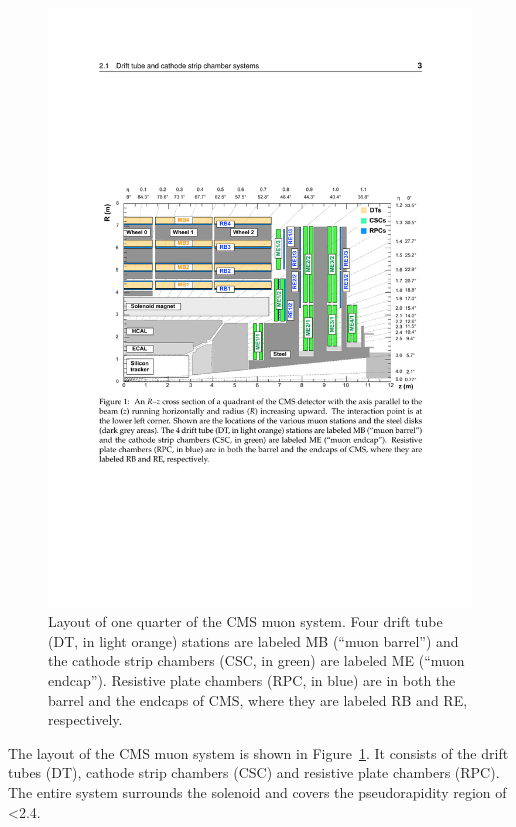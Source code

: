 \begin{figure}[htbp]
  \begin{center}
    \leavevmode
    \includegraphics[width=\columnwidth]{muon_system}
    \caption{Layout of one quarter of the CMS muon system. Four drift tube (DT, in light orange) stations are labeled MB
    (“muon barrel”) and the cathode strip chambers (CSC, in green) are labeled ME (“muon endcap”). Resistive plate
    chambers (RPC, in blue) are in both the barrel and the endcaps of CMS, where they are labeled RB and RE,
    respectively.}
    \label{muon_system}
  \end{center}
\end{figure}

The layout of the CMS muon system is shown in Figure~\ref{muon_system}. It consists of the drift tubes (DT), cathode
strip chambers (CSC) and resistive plate chambers (RPC). The entire system surrounds the solenoid and covers the
pseudorapidity region of \abs\eta \num{<2.4}.

